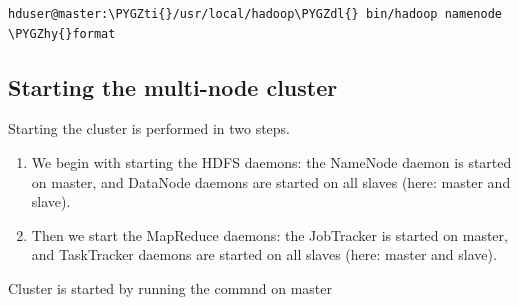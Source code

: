 \documentclass[a4paper,12pt,oneside]{sphinxmanual}
\def\PYGZdl{\char`\$}
\def\PYGZhy{\char`\-}
\def\PYGZti{\char`\~}
\begin{document}
\begin{Verbatim}[commandchars=\\\{\}]
hduser@master:\PYGZti{}/usr/local/hadoop\PYGZdl{} bin/hadoop namenode \PYGZhy{}format
\end{Verbatim}
\begin{figure}[htbp]
\centering

\end{figure}


\subsection{Starting the multi-node cluster}
\label{document:starting-the-multi-node-cluster}
Starting the cluster is performed in two steps.
\begin{enumerate}
\item {} 
We begin with starting the HDFS daemons: the NameNode daemon is started on master, and DataNode daemons are started on all slaves (here: master and slave).

\item {} 
Then we start the MapReduce daemons: the JobTracker is started on master, and TaskTracker daemons are started on all slaves (here: master and slave).

\end{enumerate}

Cluster is started by running the commnd on master
\end{document}
